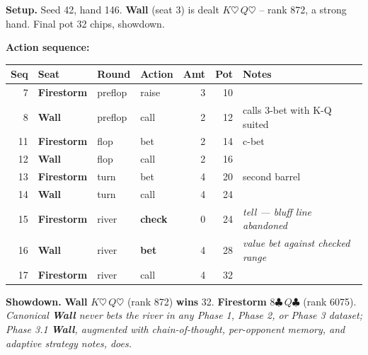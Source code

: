 \documentclass[journal,onecolumn]{IEEEtran}
\newcommand{\arch}[1]{\textbf{#1}}
\begin{document}
\begin{tcolorbox}[storyhand={Supplementary Box~S2.\quad The inversion in a single hand (original five-seed Phase 3.1 exploration, hand \#146, 17 actions, 32-chip pot)}]
\scriptsize
\textbf{Setup.} Seed 42, hand 146. \arch{Wall} (seat 3) is dealt
$K\heartsuit\,Q\heartsuit$ -- rank 872, a strong hand. Final pot
32 chips, showdown.

\smallskip
\noindent\textbf{Action sequence:}\par\nopagebreak
\begin{center}
\setlength{\tabcolsep}{3pt}\begin{tabularx}{\linewidth}{@{}rlllrr>{\raggedright\arraybackslash}X@{}}
\toprule
Seq & Seat & Round & Action & Amt & Pot & Notes \\
\midrule
 7 & \arch{Firestorm} & preflop & raise          & 3 & 10 &  \\
 8 & \arch{Wall}      & preflop & call           & 2 & 12 & calls 3-bet with K-Q suited \\
11 & \arch{Firestorm} & flop    & bet            & 2 & 14 & c-bet \\
12 & \arch{Wall}      & flop    & call           & 2 & 16 &  \\
13 & \arch{Firestorm} & turn    & bet            & 4 & 20 & second barrel \\
14 & \arch{Wall}      & turn    & call           & 4 & 24 &  \\
15 & \arch{Firestorm} & river   & \textbf{check} & 0 & 24 & \textit{tell --- bluff line abandoned} \\
16 & \arch{Wall}      & river   & \textbf{bet}   & 4 & 28 & \textit{value bet against checked range} \\
17 & \arch{Firestorm} & river   & call           & 4 & 32 &  \\
\bottomrule
\end{tabularx}
\end{center}

\smallskip
\noindent\textbf{Showdown.}
\arch{Wall} $K\heartsuit\,Q\heartsuit$ (rank 872) \textbf{wins} 32.
\arch{Firestorm} $8\clubsuit\,Q\clubsuit$ (rank 6075).
\textit{Canonical \arch{Wall} never bets the river in any Phase 1,
Phase 2, or Phase 3 dataset; Phase 3.1 \arch{Wall}, augmented with
chain-of-thought, per-opponent memory, and adaptive strategy
notes, does.}
\end{tcolorbox}
\end{document}

